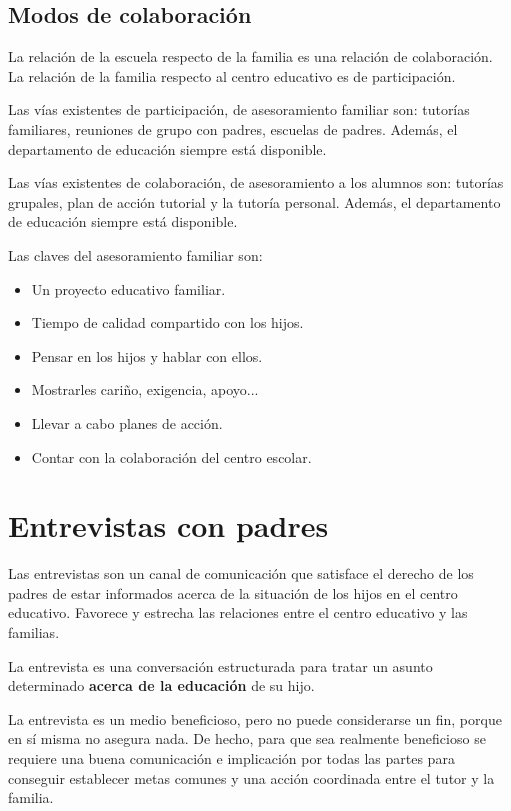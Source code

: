 \documentclass[palatino]{apuntesURJC}
\begin{document}
\subsection{Modos de colaboración}

La relación de la escuela respecto de la familia es una relación de colaboración.
%
La relación de la familia respecto al centro educativo es de participación.

Las vías existentes de participación, de asesoramiento familiar son: tutorías familiares, reuniones de grupo con padres, escuelas de padres.
%
Además, el departamento de educación siempre está disponible.

Las vías existentes de colaboración, de asesoramiento a los alumnos son: tutorías grupales, plan de acción tutorial y la tutoría personal.
%
Además, el departamento de educación siempre está disponible.


Las claves del asesoramiento familiar son:
\begin{itemize}
	\item Un proyecto educativo familiar.
	\item Tiempo de calidad compartido con los hijos.
	\item Pensar en los hijos y hablar con ellos.
	\item Mostrarles cariño, exigencia, apoyo...
	\item Llevar a cabo planes de acción.
	\item Contar con la colaboración del centro escolar.
\end{itemize}


\section{Entrevistas con padres}

Las entrevistas son un canal de comunicación que satisface el derecho de los padres de estar informados acerca de la situación de los hijos en el centro educativo. 
%
Favorece y estrecha las relaciones entre el centro educativo y las familias.

La entrevista es una conversación estructurada para tratar un asunto determinado \textbf{acerca de la educación} de su hijo.

La entrevista es un medio beneficioso, pero no puede considerarse un fin, porque en sí misma no asegura nada.
%
De hecho, para que sea realmente beneficioso se requiere una buena comunicación e implicación por todas las partes para conseguir establecer metas comunes y una acción coordinada entre el tutor y la familia.
\end{document}

